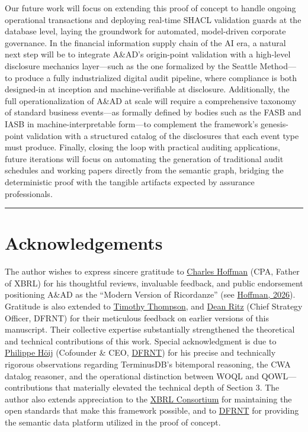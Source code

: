 \documentclass[12pt, a4paper]{article}
\begin{document}
Our future work will focus on extending this proof of concept to handle ongoing operational transactions and deploying real-time SHACL validation guards at the database level, laying the groundwork for automated, model-driven corporate governance. In the financial information supply chain of the AI era, a natural next step will be to integrate A\&AD's origin-point validation with a high-level disclosure mechanics layer---such as the one formalized by the Seattle Method---to produce a fully industrialized digital audit pipeline, where compliance is both designed-in at inception and machine-verifiable at disclosure. Additionally, the full operationalization of A\&AD at scale will require a comprehensive taxonomy of standard business events---as formally defined by bodies such as the FASB and IASB in machine-interpretable form---to complement the framework's genesis-point validation with a structured catalog of the disclosures that each event type must produce. Finally, closing the loop with practical auditing applications, future iterations will focus on automating the generation of traditional audit schedules and working papers directly from the semantic graph, bridging the deterministic proof with the tangible artifacts expected by assurance professionals.

\hrule
\vspace{1em}

\section*{Acknowledgements}

The author wishes to express sincere gratitude to \href{https://www.linkedin.com/in/charleshoffmancpa/}{Charles Hoffman} (CPA, Father of XBRL) for his thoughtful reviews, invaluable feedback, and public endorsement positioning A\&AD as the ``Modern Version of Ricordanze'' (see \href{https://digitalfinancialreporting.blogspot.com/2026/07/modern-version-of-ricordanze.html}{Hoffman, 2026}). Gratitude is also extended to \href{https://www.linkedin.com/in/timathompson/}{Timothy Thompson}, and \href{https://www.linkedin.com/in/deanritz/}{Dean Ritz} (Chief Strategy Officer, DFRNT) for their meticulous feedback on earlier versions of this manuscript. Their collective expertise substantially strengthened the theoretical and technical contributions of this work. Special acknowledgment is due to \href{https://www.linkedin.com/in/hoijnet}{Philippe Höij} (Cofounder \& CEO, \href{https://dfrnt.com}{DFRNT}) for his precise and technically rigorous observations regarding TerminusDB's bitemporal reasoning, the CWA datalog reasoner, and the operational distinction between WOQL and QOWL---contributions that materially elevated the technical depth of Section 3. The author also extends appreciation to the \href{https://www.xbrl.org}{XBRL Consortium} for maintaining the open standards that make this framework possible, and to \href{https://dfrnt.com}{DFRNT} for providing the semantic data platform utilized in the proof of concept.
\end{document}
